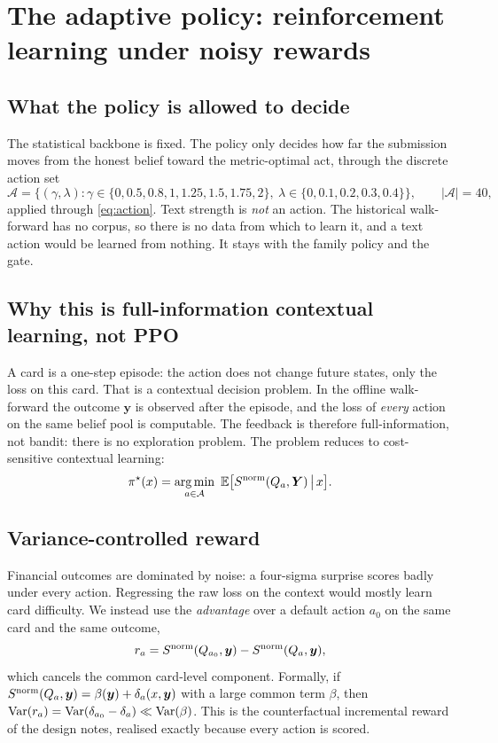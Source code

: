 \section{The adaptive policy: reinforcement learning under noisy rewards}\label{sec:policy}

\subsection{What the policy is allowed to decide}

The statistical backbone is fixed. The policy only decides how far the submission moves from the honest belief toward the metric-optimal act,
through the discrete action set
\begin{equation}
  \mathcal A=\{(\gamma,\lambda):\gamma\in\{0,0.5,0.8,1,1.25,1.5,1.75,2\},\ \lambda\in\{0,0.1,0.2,0.3,0.4\}\},\qquad |\mathcal A|=40,
\end{equation}
applied through \eqref{eq:action}. Text strength is \emph{not} an action. The historical walk-forward has no corpus, so there is no data from which
to learn it, and a text action would be learned from nothing. It stays with the family policy and the gate.

\subsection{Why this is full-information contextual learning, not PPO}

A card is a one-step episode: the action does not change future states, only the loss on this card. That is a contextual decision problem. In
the offline walk-forward the outcome $\bm y$ is observed after the episode, and the loss of \emph{every} action on the same belief pool is
computable. The feedback is therefore full-information, not bandit: there is no exploration problem. The problem reduces to cost-sensitive
contextual learning:
\begin{equation}
  \pi^\star(x)=\argmin_{a\in\mathcal A}\ \E\bigl[\Snorm(Q_a,\bm Y)\,\big|\,x\bigr].
\end{equation}

\subsection{Variance-controlled reward}

Financial outcomes are dominated by noise: a four-sigma surprise scores badly under every action. Regressing the raw loss on the context would
mostly learn card difficulty. We instead use the \emph{advantage} over a default action $a_0$ on the same card and the same outcome,
\begin{equation}
  r_a = S^{\mathrm{norm}}(Q_{a_0},\bm y)-S^{\mathrm{norm}}(Q_a,\bm y),
\end{equation}
which cancels the common card-level component. Formally, if $S^{\mathrm{norm}}(Q_a,\bm y)=\beta(\bm y)+\delta_a(x,\bm y)$ with a large common term $\beta$,
then $\operatorname{Var}(r_a)=\operatorname{Var}(\delta_{a_0}-\delta_a)\ll\operatorname{Var}(\beta)$. This is the counterfactual incremental reward of the design notes, realised exactly
because every action is scored.

